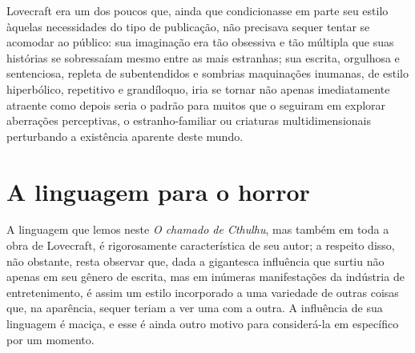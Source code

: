 
Lovecraft era um dos poucos que, ainda que condicionasse em parte seu
estilo àquelas necessidades do tipo de publicação, não precisava
sequer tentar se acomodar ao público: sua imaginação era tão obsessiva e tão
múltipla que suas histórias se sobressaíam mesmo entre as mais
estranhas; sua escrita, orgulhosa e sentenciosa, repleta de
subentendidos e sombrias maquinações inumanas, de estilo hiperbólico,
repetitivo e grandíloquo, iria se tornar não apenas imediatamente
atraente como depois seria o padrão para muitos que o seguiram em
explorar aberrações perceptivas, o estranho-familiar ou criaturas
multidimensionais perturbando a existência aparente deste mundo.

\section{A linguagem para o horror}

A linguagem que lemos neste \emph{O chamado de Cthulhu}, mas também em toda
a obra de Lovecraft, é rigorosamente característica de seu autor; a
respeito disso, não obstante, resta observar que, dada a gigantesca
influência que surtiu não apenas em seu gênero de escrita, mas em
inúmeras manifestações da indústria de entretenimento, é assim um estilo
incorporado a uma variedade de outras coisas que, na aparência, sequer
teriam a ver uma com a outra. A influência de sua linguagem é maciça, e
esse é ainda outro motivo para considerá-la em específico por um
momento.

